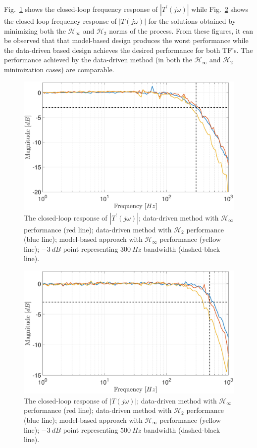 \documentclass[a4paper, 10pt, conference]{ieeeconf}
\begin{document}
Fig.~\ref{fig:d_loop} shows the closed-loop frequency response of $|T^{\prime}(j\omega)|$ while Fig.~\ref{fig:v_loop} shows the closed-loop frequency response of $|T(j\omega)|$ for the solutions obtained by minimizing both the $\mathcal{H}_{\infty}$ and $\mathcal{H}_2$ norms of the process. From these figures, it can be observed that that model-based design produces the worst performance while the data-driven based design achieves the desired performance for both TF's. The performance achieved by the data-driven method (in both the $\mathcal{H}_{\infty}$ and $\mathcal{H}_2$ minimization cases) are comparable. 
\begin{figure}
\centering
\includegraphics[width=\columnwidth]{../pics/d_loop_mag.eps}
\caption{The closed-loop response of $|T^{\prime}(j\omega)|$; data-driven method with $\mathcal{H}_{\infty}$ performance (red line); data-driven method with $\mathcal{H}_2$ performance (blue line); model-based approach with $\mathcal{H}_{\infty}$ performance (yellow line); $-3 \: dB$ point representing $300 \: Hz$ bandwidth (dashed-black line).}
\label{fig:d_loop}
\end{figure} 

\begin{figure}
\centering
\includegraphics[width=\columnwidth]{../pics/v_loop_mag.eps}
\caption{The closed-loop response of $|T(j\omega)|$; data-driven method with $\mathcal{H}_{\infty}$ performance (red line); data-driven method with $\mathcal{H}_2$ performance (blue line); model-based approach with $\mathcal{H}_{\infty}$ performance (yellow line); $-3 \: dB$ point representing $500 \: Hz$ bandwidth (dashed-black line).}
\label{fig:v_loop}
\end{figure} 
\end{document}
